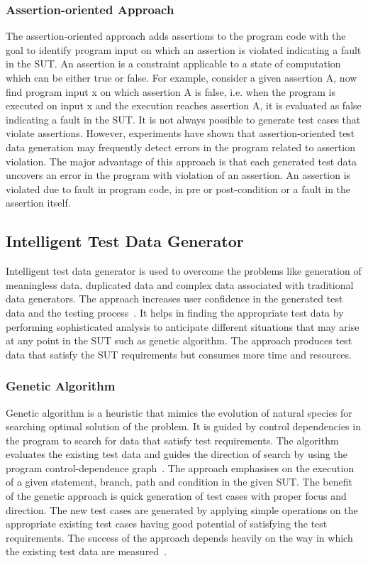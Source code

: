 \subsubsection{Assertion-oriented Approach}
The assertion-oriented approach adds assertions to the program code with the goal to identify program input on which an assertion is violated indicating a fault in the SUT. An assertion is a constraint applicable to a state of computation which can be either true or false. For example, consider a given assertion A, now find program input x on which assertion A is false, i.e. when the program is executed on input x and the execution reaches assertion A, it is evaluated as false indicating a fault in the SUT. It is not always possible to generate test cases that violate assertions. However, experiments have shown that assertion-oriented test data generation may frequently detect errors in the program related to assertion violation. The major advantage of this approach is that each generated test data uncovers an error in the program with violation of an assertion. An assertion is violated due to fault in program code, in pre or post-condition or a fault in the assertion itself.



\subsection{Intelligent Test Data Generator}
\label{sec:intelligent_2}
Intelligent test data generator is used to overcome the problems like generation of meaningless data, duplicated data and complex data associated with traditional data generators. The approach increases user confidence in the generated test data and the testing process~\cite{ramamoorthy1975testing}. It helps in finding the appropriate test data by performing sophisticated analysis to anticipate different situations that may arise at any point in the SUT such as genetic algorithm. The approach produces test data that satisfy the SUT requirements but consumes more time and resources.

\subsubsection{Genetic Algorithm}
Genetic algorithm is a heuristic that mimics the evolution of natural species for searching optimal solution of the problem. It is guided by control dependencies in the program to search for data that satisfy test requirements. The algorithm evaluates the existing test data and guides the direction of search by using the program control-dependence graph~\cite{pargas1999test}. The approach emphasises on the execution of a given statement, branch, path and condition in the given SUT. The benefit of the genetic approach is quick generation of test cases with proper focus and direction. The new test cases are generated by applying simple operations on the appropriate existing test cases having good potential of satisfying the test requirements. The success of the approach depends heavily on the way in which the existing test data are measured~\cite{pargas1999test}.

